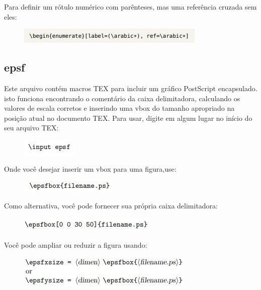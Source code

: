 \documentclass[12pt]{article}
\begin{document}
			Para definir um rótulo numérico com parênteses, mas uma referência cruzada sem eles:
			
			\begin{figure}[!htb]
				\centering
				\includegraphics[scale=1]{4.JPG}
			\end{figure}
		
		
		\subsection{epsf}
			Este arquivo contém macros TEX para incluir um gráfico PostScript encapsulado. isto
			funciona encontrando o comentário da caixa delimitadora, calculando os valores de escala corretos e
			inserindo uma vbox do tamanho apropriado na posição atual no documento TEX.
			Para usar, digite em algum lugar no início do seu arquivo TEX:
			
			\begin{figure}[!htb]
				\centering
				\includegraphics[scale=1]{5.JPG}
			\end{figure}
			
			Onde você desejar inserir um vbox para uma figura,use:
			
			\begin{figure}[!htb]
				\centering
				\includegraphics[scale=1]{6.JPG}
			\end{figure}
			
			Como alternativa, você pode fornecer sua própria caixa delimitadora:
			
			\begin{figure}[!htb]
				\centering
				\includegraphics[scale=1]{7.JPG}
			\end{figure}
			
			Você pode ampliar ou reduzir a figura usando:
			
			\begin{figure}[!htb]
				\centering
				\includegraphics[scale=1]{8.JPG}
			\end{figure}
			
\end{document}
